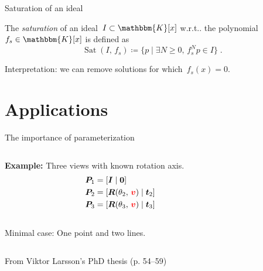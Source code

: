 \documentclass[aspectratio=169]{beamer}
\makeatletter
\newcommand{\K}{\ensuremath{\mathbbm{K}}}
\newcommand{\mat}[1]{\bm{#1}}
\DeclareRobustCommand\wrt{w.r.t\@ifnextchar.{}{.\@}}
\DeclareMathOperator{\sat}{Sat}
\makeatother
\begin{document}
\begin{frame}{Saturation of an ideal}
\begin{definition}
The \emph{saturation} of an ideal~$I\subset\K[x]$ \wrt{} the polynomial $f_s\in\K[x]$ is
defined as
\begin{equation*}
    \sat(I,\, f_s) \coloneqq \{p\;|\;\exists N\geq 0,\, f_s^N p\in I  \}\;.
\end{equation*}
\end{definition}
\alert{Interpretation:} we can remove solutions for which~$f_s(x) =0$.
\end{frame}

\section{Applications}
\begin{frame}{The importance of parameterization}
\begin{columns}
    \begin{column}{0.5\textwidth}
        \textbf{Example:} Three views with known rotation axis.\\[8mm]
        \begin{equation*}
            \begin{aligned}
                \mat{P}_1 &= [\mat{I}\;|\;\mat{0}] \\
                \mat{P}_2 &= [\mat{R}(\theta_2,\,{\color{red}\mat{v}})\;|\;\mat{t}_2] \\
                \mat{P}_3 &= [\mat{R}(\theta_3,\,{\color{red}\mat{v}})\;|\;\mat{t}_3]
            \end{aligned}
        \end{equation*}\\[8mm]
        Minimal case: One point and two lines.
    \end{column}%
    \begin{column}{0.5\textwidth}
        \centering
        
    \end{column}
\end{columns}
{\footnotesize From Viktor Larsson's PhD thesis (p. 54--59)}
\end{frame}
\end{document}

